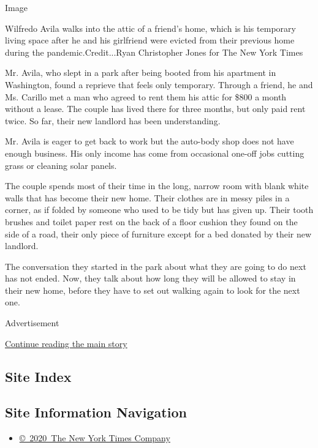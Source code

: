Image

Wilfredo Avila walks into the attic of a friend's home, which is his
temporary living space after he and his girlfriend were evicted from
their previous home during the pandemic.Credit...Ryan Christopher Jones
for The New York Times

Mr. Avila, who slept in a park after being booted from his apartment in
Washington, found a reprieve that feels only temporary. Through a
friend, he and Ms. Carillo met a man who agreed to rent them his attic
for \$800 a month without a lease. The couple has lived there for three
months, but only paid rent twice. So far, their new landlord has been
understanding.

Mr. Avila is eager to get back to work but the auto-body shop does not
have enough business. His only income has come from occasional one-off
jobs cutting grass or cleaning solar panels.

The couple spends most of their time in the long, narrow room with blank
white walls that has become their new home. Their clothes are in messy
piles in a corner, as if folded by someone who used to be tidy but has
given up. Their tooth brushes and toilet paper rest on the back of a
floor cushion they found on the side of a road, their only piece of
furniture except for a bed donated by their new landlord.

The conversation they started in the park about what they are going to
do next has not ended. Now, they talk about how long they will be
allowed to stay in their new home, before they have to set out walking
again to look for the next one.

Advertisement

\protect\hyperlink{after-bottom}{Continue reading the main story}

\hypertarget{site-index}{%
\subsection{Site Index}\label{site-index}}

\hypertarget{site-information-navigation}{%
\subsection{Site Information
Navigation}\label{site-information-navigation}}

\begin{itemize}
\tightlist
\item
  \href{https://help.nytimes.com/hc/en-us/articles/115014792127-Copyright-notice}{©~2020~The
  New York Times Company}
\end{itemize}


